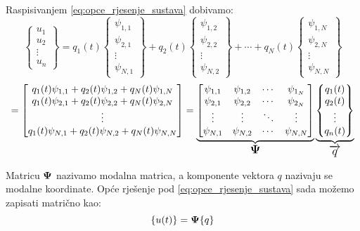 Raspisivanjem \eqref{eq:opce_rjesenje_sustava} dobivamo:
\[
	\begin{Bmatrix}
		u_1\\
		u_2\\
		\vdots\\
		u_n
	\end{Bmatrix}
	=
	q_1(t)
	\begin{Bmatrix}
		\psi_{1,1}\\
		\psi_{2,1}\\
		\vdots\\
		\psi_{N,1}
	\end{Bmatrix}
	+
	q_2(t)
	\begin{Bmatrix}
		\psi_{1,2}\\
		\psi_{2,2}\\
		\vdots\\
		\psi_{N,2}
	\end{Bmatrix}
		+
		\cdots
		+
	q_N(t)
	\begin{Bmatrix}
		\psi_{1,N}\\
		\psi_{2,N}\\
		\vdots\\
		\psi_{N,N}
	\end{Bmatrix}
	\]
\[
	=
	\begin{bmatrix}
		q_1(t) \psi_{1,1} + q_2(t) \psi_{1,2} + q_N(t) \psi_{1,N} \\
		q_1(t) \psi_{2,1} + q_2(t) \psi_{2,2} + q_N(t) \psi_{2,N} \\
		\vdots \\
		q_1(t) \psi_{N,1} + q_2(t) \psi_{N,2} + q_N(t) \psi_{N,N}
	\end{bmatrix}
	=
	\underbrace{
	\begin{bmatrix}
		\psi_{1,1} & \psi_{1,2} & \cdots & \psi_{1_N} \\
		\psi_{2,1} & \psi_{2,2} & \cdots & \psi_{2_N} \\
		\vdots & \vdots & \ddots & \vdots \\
		\psi_{N,1} & \psi_{N,2} & \cdots & \psi_{N,N} 
	\end{bmatrix}
	}_{\text{\large{$\mathbf{\Psi}$}}}
	\underbrace{
	\begin{Bmatrix}
		q_1(t) \\
		q_2(t) \\
		\vdots \\
		q_n(t)
	\end{Bmatrix}
	}_{\text{\large{$\overrightarrow{q}$}}}
\]

Matricu $\mathbf{\Psi}$ nazivamo modalna matrica, a komponente vektora $q$ nazivaju se
modalne koordinate. Opće rješenje pod \eqref{eq:opce_rjesenje_sustava} sada možemo 
zapisati matrično kao:
\begin{equation}
    \{u(t)\} = \mathbf{\Psi} \{q\}
\end{equation}



